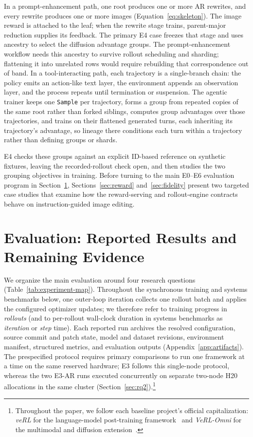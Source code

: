 \documentclass[10pt]{article}
\newcommand{\sample}{\texttt{Sample}}
\begin{document}
In a prompt-enhancement path, one root produces one or more AR rewrites, and every rewrite produces one or more images (Equation~\ref{eq:skeleton}).
The image reward is attached to the leaf; when the rewrite stage trains, parent-major reduction supplies its feedback.
The primary E4 case freezes that stage and uses ancestry to select the diffusion advantage groups.
The prompt-enhancement workflow needs this ancestry to survive rollout scheduling and sharding; flattening it into unrelated rows would require rebuilding that correspondence out of band.
In a tool-interacting path, each trajectory is a single-branch chain: the policy emits an action-like text layer, the environment appends an observation layer, and the process repeats until termination or suspension.
The agentic trainer keeps one \sample{} per trajectory, forms a group from repeated copies of the same root rather than forked siblings, computes group advantages over those trajectories, and trains on their flattened generated turns, each inheriting its trajectory's advantage, so lineage there conditions each turn within a trajectory rather than defining groups or shards.

E4 checks these groups against an explicit ID-based reference on synthetic fixtures, leaving the recorded-rollout check open, and then studies the two grouping objectives in training.
Before turning to the main E0--E6 evaluation program in Section~\ref{sec:evaluation}, Sections~\ref{sec:reward} and~\ref{sec:fidelity} present two targeted case studies that examine how the reward-serving and rollout-engine contracts behave on instruction-guided image editing.





\section{Evaluation: Reported Results and Remaining Evidence}
\label{sec:evaluation}

We organize the main evaluation around four research questions (Table~\ref{tab:experiment-map}).
Throughout the synchronous training and systems benchmarks below, one outer-loop iteration collects one rollout batch and applies the configured optimizer updates; we therefore refer to training progress in \emph{rollouts} (and to per-rollout wall-clock duration in systems benchmarks as \emph{iteration} or \emph{step} time).
Each reported run archives the resolved configuration, source commit and patch state, model and dataset revisions, environment manifest, structured metrics, and evaluation outputs (Appendix~\ref{app:artifacts}).
The prespecified protocol requires primary comparisons to run one framework at a time on the same reserved hardware; E3 follows this single-node protocol, whereas the two E3-AR runs executed concurrently on separate two-node H20 allocations in the same cluster (Section~\ref{sec:rq2}).\footnote{Throughout the paper, we follow each baseline project's official capitalization: \emph{veRL} for the language-model post-training framework~\citep{sheng2024hybridflow} and \emph{VeRL-Omni} for the multimodal and diffusion extension~\citep{verlomni2026}.}
\end{document}
